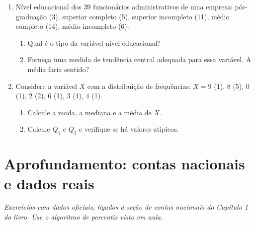 \documentclass[11pt]{article}
\begin{document}
\begin{enumerate}[label=\textbf{C\arabic*.}, leftmargin=*]
\begin{center}
\begin{tabular}{c|ccccccc|c}
\bottomrule
\end{tabular}
\end{center}
Encontre a moda, a média, a mediana e os quartis $Q_1$ e $Q_3$ (use o algoritmo de percentis da aula).
\item Nível educacional dos 39 funcionários administrativos de uma empresa: pós-graduação (3), superior completo (5), superior incompleto (11), médio completo (14), médio incompleto (6).
\begin{enumerate}[label=(\alph*)]
  \item Qual é o tipo da variável nível educacional?
  \item Forneça uma medida de tendência central adequada para essa variável. A média faria sentido?
\end{enumerate}
\item Considere a variável $X$ com a distribuição de frequências: $X = 9$ (1), $8$ (5), $0$ (1), $2$ (2), $6$ (1), $3$ (4), $4$ (1).
\begin{enumerate}[label=(\alph*)]
  \item Calcule a moda, a mediana e a média de $X$.
  \item Calcule $Q_1$ e $Q_3$ e verifique se há valores atípicos.
\end{enumerate}

\end{enumerate}

\bigskip
{}
\section*{Aprofundamento: contas nacionais e dados reais}
\noindent\textit{Exercícios com dados oficiais, ligados à seção de contas nacionais do Capítulo 1 do livro. Use o algoritmo de percentis visto em aula.}
\end{document}
